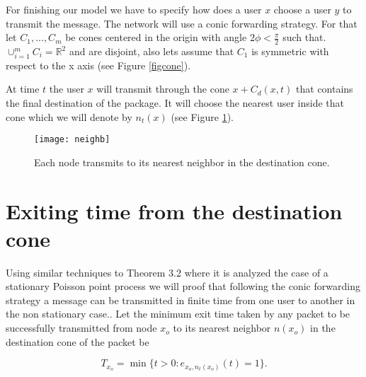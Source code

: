 For finishing our model we have to specify how does a user $x$ choose a user $y$ to transmit the message. The network will use a conic forwarding strategy. For that let $C_1,...,C_m$ be cones centered in the origin with angle $2\phi<\frac{\pi}{2}$ such that. $\cup_{i=1}^m C_i=\mathbb{R}^2$ and are disjoint, also lets assume that $C_1$ is symmetric with respect to the x axis (see Figure \ref{figcone}). 

At time $t$ the user $x$ will transmit through the cone $x+C_d(x,t)$ that contains the final destination of the package. It will choose the nearest user inside that cone which we will denote by $n_t(x)$ (see Figure \ref{neighb}). 
\begin{figure}
\captionsetup{width=1\textwidth}
  \centering
    \texttt{[image: neighb]}
    \caption{Each node transmits to its nearest neighbor in the destination cone.}
 \label{neighb}
\end{figure}
\section{Exiting time from the destination cone} 

Using similar techniques to \cite{Iye} Theorem 3.2 where it is analyzed the case of a stationary Poisson point process we will proof that following the conic forwarding strategy a message can be transmitted in finite time from one user to another in the non stationary case.. Let the minimum exit time taken by any packet to be successfully transmitted from node $x_o$ to its nearest neighbor $n(x_o)$ in the destination cone of the packet be

$$T_{x_o}=\min\lbrace t>0:e_{x_o,n_t(x_o)}(t)=1\rbrace. $$


